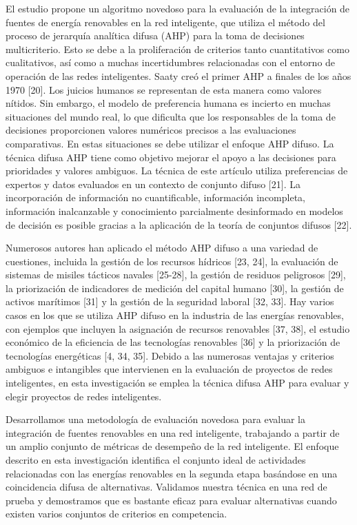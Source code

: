 \documentclass[
]{article}
\begin{document}
El estudio propone un algoritmo novedoso para la evaluación de la
integración de fuentes de energía renovables en la red inteligente, que
utiliza el método del proceso de jerarquía analítica difusa (AHP) para
la toma de decisiones multicriterio. Esto se debe a la proliferación de
criterios tanto cuantitativos como cualitativos, así como a muchas
incertidumbres relacionadas con el entorno de operación de las redes
inteligentes. Saaty creó el primer AHP a finales de los años 1970
{[}20{]}. Los juicios humanos se representan de esta manera como valores
nítidos. Sin embargo, el modelo de preferencia humana es incierto en
muchas situaciones del mundo real, lo que dificulta que los responsables
de la toma de decisiones proporcionen valores numéricos precisos a las
evaluaciones comparativas. En estas situaciones se debe utilizar el
enfoque AHP difuso. La técnica difusa AHP tiene como objetivo mejorar el
apoyo a las decisiones para prioridades y valores ambiguos. La técnica
de este artículo utiliza preferencias de expertos y datos evaluados en
un contexto de conjunto difuso {[}21{]}. La incorporación de información
no cuantificable, información incompleta, información inalcanzable y
conocimiento parcialmente desinformado en modelos de decisión es posible
gracias a la aplicación de la teoría de conjuntos difusos {[}22{]}.

Numerosos autores han aplicado el método AHP difuso a una variedad de
cuestiones, incluida la gestión de los recursos hídricos {[}23, 24{]},
la evaluación de sistemas de misiles tácticos navales {[}25-28{]}, la
gestión de residuos peligrosos {[}29{]}, la priorización de indicadores
de medición del capital humano {[}30{]}, la gestión de activos marítimos
{[}31{]} y la gestión de la seguridad laboral {[}32, 33{]}. Hay varios
casos en los que se utiliza AHP difuso en la industria de las energías
renovables, con ejemplos que incluyen la asignación de recursos
renovables {[}37, 38{]}, el estudio económico de la eficiencia de las
tecnologías renovables {[}36{]} y la priorización de tecnologías
energéticas {[}4, 34, 35{]}. Debido a las numerosas ventajas y criterios
ambiguos e intangibles que intervienen en la evaluación de proyectos de
redes inteligentes, en esta investigación se emplea la técnica difusa
AHP para evaluar y elegir proyectos de redes inteligentes.

Desarrollamos una metodología de evaluación novedosa para evaluar la
integración de fuentes renovables en una red inteligente, trabajando a
partir de un amplio conjunto de métricas de desempeño de la red
inteligente. El enfoque descrito en esta investigación identifica el
conjunto ideal de actividades relacionadas con las energías renovables
en la segunda etapa basándose en una coincidencia difusa de
alternativas. Validamos nuestra técnica en una red de prueba y
demostramos que es bastante eficaz para evaluar alternativas cuando
existen varios conjuntos de criterios en competencia.
\end{document}
